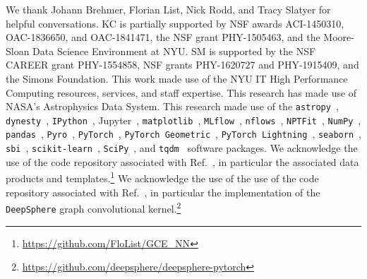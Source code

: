 \documentclass[prd,aps,10pt,nofootinbib,twocolumn,superscriptaddress,preprintnumbers,balancelastpage,longbibliography]{revtex4-1}
\begin{document}
\begin{acknowledgments}

We thank Johann Brehmer, Florian List, Nick Rodd, and Tracy Slatyer for helpful conversations.  
KC is partially supported by NSF awards ACI-1450310, OAC-1836650, and OAC-1841471, the NSF grant PHY-1505463, and the Moore-Sloan Data Science Environment at NYU. 
SM is supported by the NSF CAREER grant PHY-1554858, NSF grants PHY-1620727 and PHY-1915409, and the Simons Foundation. 
This work made use of the NYU IT High Performance Computing resources, services, and staff expertise. 
This research has made use of NASA's Astrophysics Data System. 
This research made use of the \texttt{astropy}~\cite{Price-Whelan:2018hus,Robitaille:2013mpa}, \texttt{dynesty}~\cite{Speagle_2020}, \texttt{IPython}~\cite{PER-GRA:2007}, Jupyter~\cite{Kluyver2016JupyterN}, \texttt{matplotlib}~\cite{Hunter:2007}, \texttt{MLflow}~\cite{chen2020developments}, \texttt{nflows}~\cite{nflows}, \texttt{NPTFit}~\cite{Mishra-Sharma:2016gis}, \texttt{NumPy}~\cite{harris2020array}, \texttt{pandas}~\cite{pandas:2010}, \texttt{Pyro}~\cite{bingham2018pyro}, \texttt{PyTorch}~\cite{NEURIPS2019_9015}, \texttt{PyTorch Geometric}~\cite{Fey/Lenssen/2019}, \texttt{PyTorch Lightning}~\cite{william_falcon_2020_3828935}, \texttt{seaborn}~\cite{seaborn}, \texttt{sbi}~\cite{tejero-cantero2020sbi}, \texttt{scikit-learn}~\cite{scikit-learn}, \texttt{SciPy}~\cite{2020SciPy-NMeth}, and \texttt{tqdm}~\cite{da2019tqdm} software packages. We acknowledge the use of the code repository associated with Ref.~\cite{List:2020mzd}, in particular the associated data products and templates.\footnote{\url{https://github.com/FloList/GCE_NN}} We acknowledge the use of the use of the code repository associated with Ref.~\cite{defferrard2020deepsphere}, in particular the implementation of the \texttt{DeepSphere} graph convolutional kernel.\footnote{\url{https://github.com/deepsphere/deepsphere-pytorch}}
\end{acknowledgments}





\end{document}
